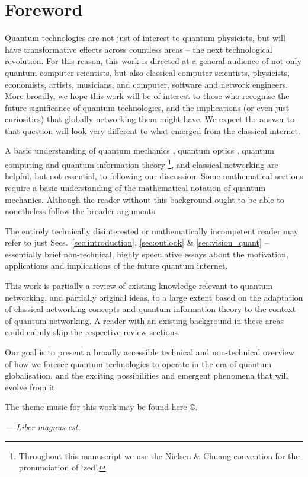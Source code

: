 %
%

\section{Foreword}

Quantum technologies are not just of interest to quantum physicists, but will have transformative effects across countless areas -- the next technological revolution. For this reason, this work is directed at a general audience of not only quantum computer scientists, but also classical computer scientists, physicists, economists, artists, musicians, and computer, software and network engineers. More broadly, we hope this work will be of interest to those who recognise the future significance of quantum technologies, and the implications (or even just curiosities) that globally networking them might have. We expect the answer to that question will look very different to what emerged from the classical internet.

A basic understanding of quantum mechanics \cite{bib:Sakurai94}, quantum optics \cite{bib:GerryKnight05}, quantum computing and quantum information theory \cite{bib:NielsenChuang00}\footnote{Throughout this manuscript we use the Nielsen \& Chuang convention for the pronunciation of `zed'.}, and classical networking \cite{bib:TanenbaumNet} are helpful, but not essential, to following our discussion. Some mathematical sections require a basic understanding of the mathematical notation of quantum mechanics. Although the reader without this background ought to be able to nonetheless follow the broader arguments.

The entirely technically disinterested or mathematically incompetent reader may refer to just Secs.~\ref{sec:introduction}, \ref{sec:outlook} \& \ref{sec:vision_quant} -- essentially brief non-technical, highly speculative essays about the motivation, applications and implications of the future quantum internet.

This work is partially a review of existing knowledge relevant to quantum networking, and partially original ideas, to a large extent based on the adaptation of classical networking concepts and quantum information theory to the context of quantum networking. A reader with an existing background in these areas could calmly skip the respective review sections.

Our goal is to present a broadly accessible technical and non-technical overview of how we foresee quantum technologies to operate in the era of quantum globalisation, and the exciting possibilities and emergent phenomena that will evolve from it.

The theme music for this work may be found \href{http://soundcloud.com/peter-rohde/wir-sind-ein-volk}{here} \copyright{}.

\textit{--- Liber magnus est.}
